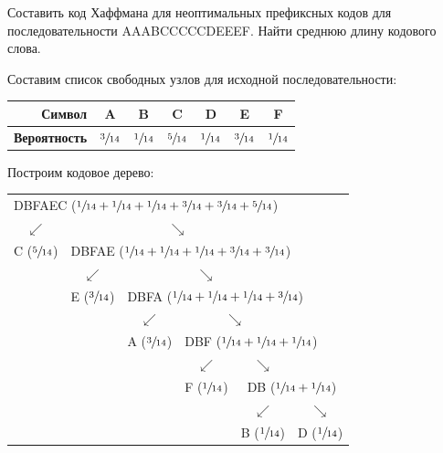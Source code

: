 \begin{example}
    \task%
    Составить код Хаффмана для неоптимальных префиксных кодов для последовательности AAABCCCCCDEEEF. Найти среднюю длину кодового слова.

    \solution%
    Составим список свободных узлов для исходной последовательности:
    \begin{table}[H]
        \centering
        \begin{tabular}{|r|c|c|c|c|c|c|}
        \hline
        \textbf{Символ} & A & B & C & D & E & F \\ \hline
        \textbf{Вероятность} & $\sfrac{3}{14}$ & $\sfrac{1}{14}$ & $\sfrac{5}{14}$ & $\sfrac{1}{14}$ & $\sfrac{3}{14}$ & $\sfrac{1}{14}$ \\ \hline
        \end{tabular}
    \end{table}

    Построим кодовое дерево:

    \begin{table}[H]
        \centering
        \begin{tabular}{c c c c c c}
            \multicolumn{6}{l}{DBFAEC ($\sfrac{1}{14} + \sfrac{1}{14} + \sfrac{1}{14} + \sfrac{3}{14} + \sfrac{3}{14} + \sfrac{5}{14}$)} \\
            $\swarrow$ & \multicolumn{4}{c}{$\searrow$} & \\
            C ($\sfrac{5}{14}$) & \multicolumn{5}{l}{DBFAE ($\sfrac{1}{14} + \sfrac{1}{14} + \sfrac{1}{14} + \sfrac{3}{14} + \sfrac{3}{14}$)} \\
            & $\swarrow$ & \multicolumn{3}{c}{$\searrow$} & \\
            & E ($\sfrac{3}{14}$) & \multicolumn{4}{l}{DBFA ($\sfrac{1}{14} + \sfrac{1}{14} + \sfrac{1}{14} + \sfrac{3}{14}$)} \\
            & & $\swarrow$ & \multicolumn{2}{c}{$\searrow$} & \\
            & & A ($\sfrac{3}{14}$) & \multicolumn{3}{l}{DBF ($\sfrac{1}{14} + \sfrac{1}{14} + \sfrac{1}{14}$)} \\
            & & & $\swarrow$ & $\searrow$ & \\
            & & & F ($\sfrac{1}{14}$) & \multicolumn{2}{c}{DB ($\sfrac{1}{14} + \sfrac{1}{14}$)} \\
            & & & & $\swarrow$ & $\searrow$ \\
            & & & & B ($\sfrac{1}{14}$) & D ($\sfrac{1}{14}$) \\
        \end{tabular}
    \end{table}


\end{example}
